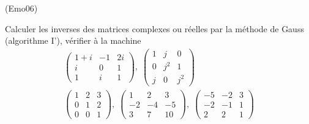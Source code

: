 \begin{tiny}(Emo06)\end{tiny}
Calculer les inverses des matrices complexes ou réelles par la m{\'e}thode de Gauss (algorithme I'), v{\'e}rifier {\`a} la machine
\begin{multline*}
\begin{pmatrix}
1+i & -1 & 2i \\
i & 0 & 1 \\
1 & i & 1  
\end{pmatrix},\;
\begin{pmatrix}
1 & j & 0 \\
0 & j^2 & 1 \\
j & 0 & j^2  
\end{pmatrix} \\
\begin{pmatrix}
 1 & 2 & 3 \\ 0 & 1 & 2 \\ 0 & 0 &1
\end{pmatrix},\;
\begin{pmatrix}
 1  & 2 & 3 \\ -2 & -4 & -5 \\ 3 & 7 & 10
\end{pmatrix},\;
\begin{pmatrix}
 -5 & -2 & 3 \\ -2 & -1 & 1 \\ 2 & 2 & 1
\end{pmatrix}
\end{multline*}
